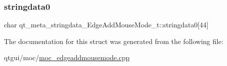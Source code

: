 \subsubsection{\texorpdfstring{stringdata0}{stringdata0}}
{\footnotesize\ttfamily char qt\+\_\+meta\+\_\+stringdata\+\_\+\+Edge\+Add\+Mouse\+Mode\+\_\+t\+::stringdata0\mbox{[}44\mbox{]}}



The documentation for this struct was generated from the following file\+:\begin{DoxyCompactItemize}
\item 
qtgui/moc/\mbox{\hyperlink{moc__edgeaddmousemode_8cpp}{moc\+\_\+edgeaddmousemode.\+cpp}}\end{DoxyCompactItemize}
